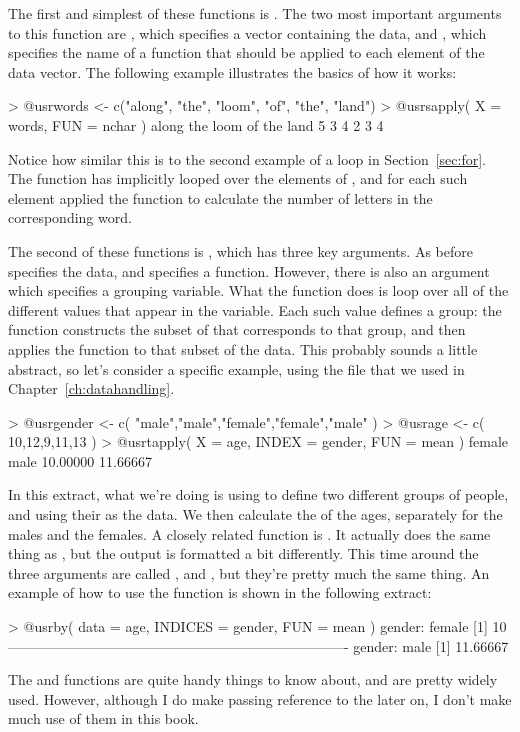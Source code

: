 The first and simplest of these functions is . The two most important arguments to this function are , which specifies a vector containing the data, and , which specifies the name of a function that should be applied to each element of the data vector. The following example illustrates the basics of how it works:
\begin{rblock1}
> @usr{words <- c("along", "the", "loom", "of", "the", "land")}
> @usr{sapply( X = words, FUN = nchar )}
along   the  loom    of   the  land 
    5     3     4     2     3     4 
\end{rblock1}
Notice how similar this is to the second example of a  loop in Section~\ref{sec:for}. The  function has implicitly looped over the elements of , and for each such element applied the  function to calculate the number of letters in the corresponding word.

The second of these functions is , which has three key arguments. As before  specifies the data, and  specifies a function. However, there is also an  argument which specifies a grouping variable. What the  function does is loop over all of the different values that appear in the  variable. Each such value defines a group: the  function constructs the subset of  that corresponds to that group, and then applies the function  to that subset of the data. This probably sounds a little abstract, so let's consider a specific example, using the  file that we used in Chapter~\ref{ch:datahandling}. 
\begin{rblock1}
> @usr{gender <- c( "male","male","female","female","male" )}
> @usr{age <- c( 10,12,9,11,13 )}
> @usr{tapply( X = age, INDEX = gender, FUN = mean )}
  female     male 
10.00000 11.66667
\end{rblock1}
In this extract, what we're doing is using  to define two different groups of people, and using their  as the data. We then calculate the  of the ages, separately for the males and the females. A closely related function is . It actually does the same thing as , but the output is formatted  a bit differently. This time around the three arguments are called ,  and , but they're pretty much the same thing. An example of how to use the  function is shown in the following extract:
\begin{rblock1}
> @usr{by( data = age, INDICES = gender, FUN = mean )}
gender: female
[1] 10
------------------------------------------------------------------------- 
gender: male
[1] 11.66667
\end{rblock1}
The  and  functions are quite handy things to know about, and are pretty widely used. However, although I do make passing reference to the  later on, I don't make much use of them in this book.

